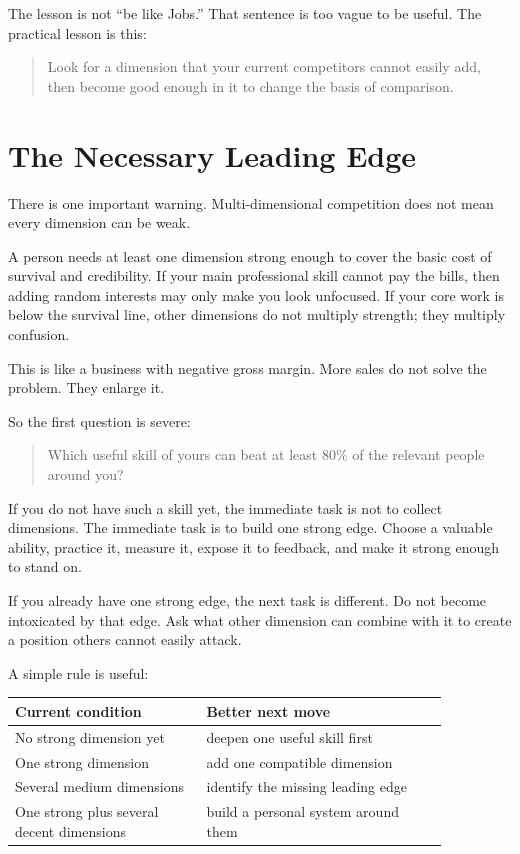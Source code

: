 The lesson is not ``be like Jobs.'' That sentence is too vague to be useful. The practical lesson is this:

\begin{quote}
Look for a dimension that your current competitors cannot easily add, then become good enough in it to change the basis of comparison.
\end{quote}

\section*{The Necessary Leading Edge}

There is one important warning. Multi-dimensional competition does not mean every dimension can be weak.

A person needs at least one dimension strong enough to cover the basic cost of survival and credibility. If your main professional skill cannot pay the bills, then adding random interests may only make you look unfocused. If your core work is below the survival line, other dimensions do not multiply strength; they multiply confusion.

This is like a business with negative gross margin. More sales do not solve the problem. They enlarge it.

So the first question is severe:

\begin{quote}
Which useful skill of yours can beat at least 80\% of the relevant people around you?
\end{quote}

If you do not have such a skill yet, the immediate task is not to collect dimensions. The immediate task is to build one strong edge. Choose a valuable ability, practice it, measure it, expose it to feedback, and make it strong enough to stand on.

If you already have one strong edge, the next task is different. Do not become intoxicated by that edge. Ask what other dimension can combine with it to create a position others cannot easily attack.

A simple rule is useful:

\begin{center}
\begin{tabular}{p{0.38\linewidth}p{0.48\linewidth}}
\hline
Current condition & Better next move \\
\hline
No strong dimension yet & deepen one useful skill first \\
One strong dimension & add one compatible dimension \\
Several medium dimensions & identify the missing leading edge \\
One strong plus several decent dimensions & build a personal system around them \\
\hline
\end{tabular}
\end{center}

